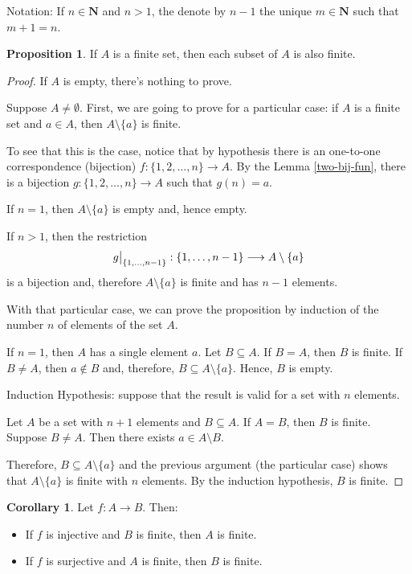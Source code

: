 \documentclass[tikz,12pt,a4paper]{article}
\theoremstyle{definition}
\newtheorem{corollary}[theorem]{Corollary}
\newtheorem{proposition}[theorem]{Proposition}
\newcommand\restr[2]{{%
  \left.\kern-\nulldelimiterspace %
  #1 %
  \vphantom{\big|} %
  \right|_{#2} %
  }}
\begin{document}
Notation: If $n \in \textbf{N}$ and $n > 1$, the denote by $n-1$ the unique $m \in \textbf{N}$ such that $m+1 = n$.

\begin{proposition}\label{finite-subset}
	If $A$ is a finite set, then each subset of $A$ is also finite.
\end{proposition}

\begin{proof}
	If $A$ is empty, there's nothing to prove.
	
	Suppose $A \neq \emptyset$. First, we are going to prove for a particular case: if $A$ is a finite set and $a \in A$, then $A \setminus \{ a \}$ is finite.
	
	To see that this is the case, notice that by hypothesis there is an one-to-one correspondence (bijection) $f : \{ 1, 2, \ldots, n \} \longrightarrow A$. By the Lemma \ref{two-bij-fun}, there is a bijection $g : \{ 1, 2, \ldots, n \} \longrightarrow A$ such that $g(n) = a$.
	
	If $n=1$, then $A \setminus \{ a \}$ is empty and, hence empty.
	
	If $n > 1$, then the restriction
	\[
	\restr{g}{\{ 1, \ldots, n-1 \}} : \{ 1, \ldots, n-1 \} \longrightarrow A \setminus \{ a \}
	\]
	is a bijection and, therefore $A \setminus \{ a \}$ is finite and has $n-1$ elements. 
	
	With that particular case, we can prove the proposition by induction of the number $n$ of elements of the set $A$.
	
	If $n=1$, then $A$ has a single element $a$. Let $B \subseteq A$. If $B=A$, then $B$ is finite. If $B \neq A$, then $a \notin B$ and, therefore, $B \subseteq A \setminus \{ a \}$. Hence, $B$ is empty. 
	
	Induction Hypothesis: suppose that the result is valid for a set with $n$ elements. 
	
	Let $A$ be a set with $n+1$ elements and $B \subseteq A$. If $A=B$, then $B$ is finite. Suppose $B \neq A$. Then there exists $a \in A \setminus B$.
	
	Therefore, $B \subseteq A \setminus \{ a \}$ and the previous argument (the particular case) shows that $A \setminus \{ a \}$ is finite with $n$ elements. By the induction hypothesis, $B$ is finite.
\end{proof}

\begin{corollary}\label{cor:injsurfin}
	Let $f : A \longrightarrow B$. Then:
	\begin{itemize}
		\item If $f$ is injective and $B$ is finite, then $A$ is finite. 
		\item If $f$ is surjective and $A$ is finite, then $B$ is finite.
	\end{itemize}
\end{corollary}
\end{document}
